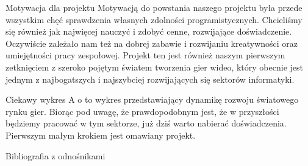 \documentclass{beamer}
\begin{document}
\begin{frame}{Motywacja dla projektu}
Motywacją do powstania naszego projektu była przede wszystkim chęć sprawdzenia własnych zdolności programistycznych.
Chcieliśmy się również jak najwięcej nauczyć\cite{david_j_malan_kurs_nodate}\cite{kanal_o_wszystkim_kurs_nodate} i zdobyć cenne, rozwijające doświadczenie.
Oczywiście zależało nam też na dobrej zabawie i rozwijaniu kreatywności oraz umiejętności pracy zespołowej.
Projekt ten jest również naszym pierwszym zetknięciem z szeroko pojętym światem tworzenia gier wideo, który obecnie jest jednym z najbogatszych i najszybciej rozwijających się sektorów informatyki.

\end{frame}

\begin{frame}{Ciekawy wykres}
A o to wykres przedstawiający dynamikę rozwoju światowego rynku gier.
Biorąc pod uwagę, że prawdopodobnym jest, że w przyszłości będziemy pracować w tym sektorze, już dziś warto nabierać doświadczenia.
Pierwszym małym krokiem jest omawiany projekt.


\end{frame}

\begin{frame}{Bibliografia z odnośnikami}
    
    
\end{frame}
\end{document}
